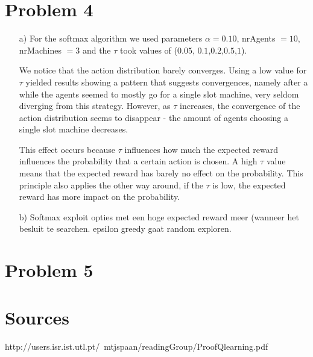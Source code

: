 \documentclass[12pt]{article}
\begin{document}
\section*{Problem 4}

\begin{enumerate}
	\item[a)]For the softmax algorithm we used parameters $\alpha = 0.10$,
	nrAgents $= 10$, nrMachines $=3$ and the $\tau$ took values of ($0.05$, $0.1$,$0.2$,$0.5$,$1$).

	We notice that the action distribution barely converges. Using a low value for $\tau$ yielded results showing a pattern that suggests convergences, namely after a while the agents seemed to mostly go for a single slot machine, very seldom diverging from this strategy. However, as $\tau$ increases, the convergence of the action distribution seems to disappear - the amount of agents choosing a single slot machine decreases.

	This effect occurs because $\tau$ influences how much the expected reward influences the probability that a certain action is chosen. A high $\tau$ value means that the expected reward has barely no effect on the probability. This principle also applies the other way around, if the $\tau$ is low, the expected reward has more impact on the probability.

	\item[b)]
	Softmax exploit opties met een hoge expected reward meer (wanneer het besluit te searchen. epsilon greedy gaat random exploren.
\end{enumerate}

\section*{Problem 5}



\section{Sources}
http://users.isr.ist.utl.pt/~mtjspaan/readingGroup/ProofQlearning.pdf
\end{document}
